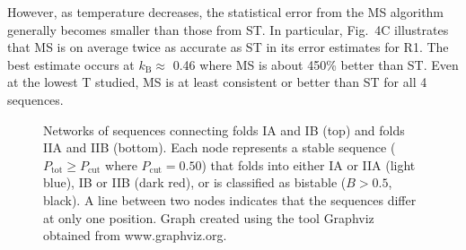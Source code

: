 \documentclass[
aip,
rsi,%
amsmath,amssymb,
reprint,%
]{revtex4-1}
\newcommand	 {\kb}		{{k_\mathrm{B}}}
\newcommand {\Pcut}     	{{P_\mathrm{cut}}}
\newcommand {\Ptot}	{{P_\mathrm{tot}}}
\begin{document}
However, as temperature decreases, the statistical error from the MS algorithm generally becomes smaller than those from ST. In particular, Fig.~4C illustrates that MS is on average twice as accurate as ST in its error estimates for R1. The best estimate occurs at $\kb\approx$ 0.46 where MS is about 450\% better than ST. Even at the lowest T studied, MS is at least consistent or better than ST for all 4 sequences.


\begin{figure}
\caption{Networks of sequences connecting folds IA and IB (top) and folds IIA and IIB (bottom). Each node represents a stable sequence ($\Ptot\ge\Pcut$ where $\Pcut=0.50$) that folds into either IA or IIA (light blue), IB or IIB (dark red), or is classified as bistable ($B>0.5$, black). A line between two nodes indicates that the sequences differ at only one position. Graph created using the tool Graphviz~\protect\cite{Graphviz2000} obtained from  www.graphviz.org.}
\end{figure}

\end{document}
